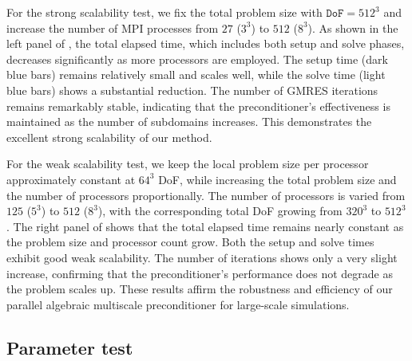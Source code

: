 \documentclass[preprint,12pt]{elsarticle}
\begin{document}
  For the strong scalability test, we fix the total problem size with
  $\mathtt{DoF}= 512^{3}$ and increase the number of MPI processes from $27$ ($3^{3}$)
  to $512$ ($8^{3}$). As shown in the left panel of , the
  total elapsed time, which includes both setup and solve phases, decreases
  significantly as more processors are employed. The setup time (dark blue bars)
  remains relatively small and scales well, while the solve time (light blue bars)
  shows a substantial reduction. The number of GMRES iterations remains remarkably
  stable, indicating that the preconditioner's effectiveness is maintained as
  the number of subdomains increases. This demonstrates the excellent strong scalability
  of our method.

  For the weak scalability test, we keep the local problem size per processor
  approximately constant at $64^{3}$ DoF, while increasing the total problem size
  and the number of processors proportionally. The number of processors is
  varied from $1 25$ ($5^{3}$) to $512$ ($8^{3}$), with the corresponding total DoF
  growing from $320^{3}$ to $512^{3}$. The right panel of 
  shows that the total elapsed time remains nearly constant as the problem size
  and processor count grow. Both the setup and solve times exhibit good weak scalability.
  The number of iterations shows only a very slight increase, confirming that the
  preconditioner's performance does not degrade as the problem scales up. These
  results affirm the robustness and efficiency of our parallel algebraic
  multiscale preconditioner for large-scale simulations.

  \subsection{Parameter test}
\end{document}
